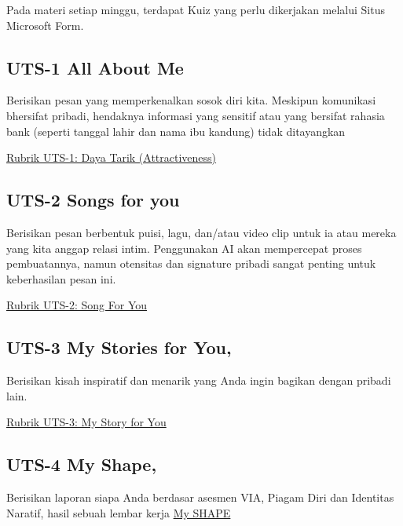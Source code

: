 \documentclass[
  letterpaper,
  DIV=11,
  numbers=noendperiod]{scrreprt}
\begin{document}
Pada materi setiap minggu, terdapat Kuiz yang perlu dikerjakan melalui
Situs Microsoft Form.

\subsection*{UTS-1 All About Me}\label{uts-1-all-about-me}

Berisikan pesan yang memperkenalkan sosok diri kita. Meskipun komunikasi
bhersifat pribadi, hendaknya informasi yang sensitif atau yang bersifat
rahasia bank (seperti tanggal lahir dan nama ibu kandung) tidak
ditayangkan

\href{./asesmen/Rubrik_II-2100_CSV/UTS-1.csv}{Rubrik UTS-1: Daya Tarik
(Attractiveness)}

\subsection*{UTS-2 Songs for you}\label{uts-2-songs-for-you}

Berisikan pesan berbentuk puisi, lagu, dan/atau video clip untuk ia atau
mereka yang kita anggap relasi intim. Penggunakan AI akan mempercepat
proses pembuatannya, namun otensitas dan signature pribadi sangat
penting untuk keberhasilan pesan ini.

\href{./asesmen/Rubrik_II-2100_CSV/UTS-2.csv}{Rubrik UTS-2: Song For
You}

\subsection*{UTS-3 My Stories for You,}\label{uts-3-my-stories-for-you}

Berisikan kisah inspiratif dan menarik yang Anda ingin bagikan dengan
pribadi lain.

\href{./asesmen/Rubrik_II-2100_CSV/UTS-4.csv}{Rubrik UTS-3: My Story for
You}

\subsection*{UTS-4 My Shape,}\label{uts-4-my-shape}

Berisikan laporan siapa Anda berdasar asesmen VIA, Piagam Diri dan
Identitas Naratif, hasil sebuah lembar kerja
\href{asesmen/UTS-4-My-SHAPE/my_shape_short_2.pdf}{My SHAPE}
\end{document}
